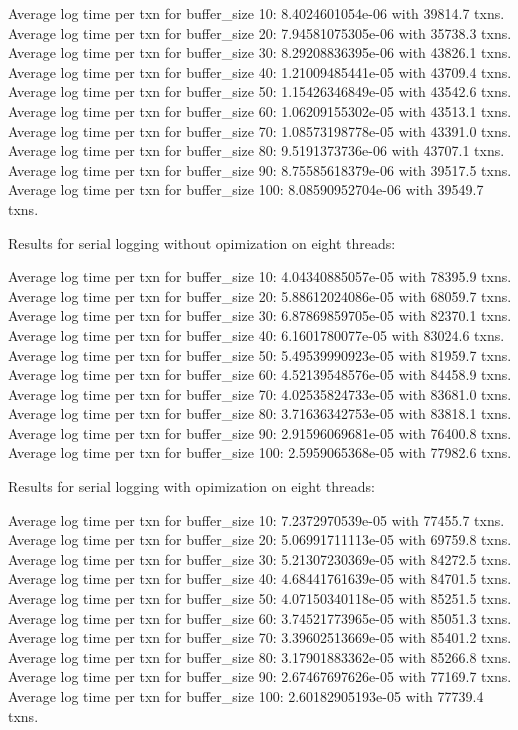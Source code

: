 Average log time per txn for buffer_size 10: 8.4024601054e-06 with 39814.7 txns.
Average log time per txn for buffer_size 20: 7.94581075305e-06 with 35738.3 txns.
Average log time per txn for buffer_size 30: 8.29208836395e-06 with 43826.1 txns.
Average log time per txn for buffer_size 40: 1.21009485441e-05 with 43709.4 txns.
Average log time per txn for buffer_size 50: 1.15426346849e-05 with 43542.6 txns.
Average log time per txn for buffer_size 60: 1.06209155302e-05 with 43513.1 txns.
Average log time per txn for buffer_size 70: 1.08573198778e-05 with 43391.0 txns.
Average log time per txn for buffer_size 80: 9.5191373736e-06 with 43707.1 txns.
Average log time per txn for buffer_size 90: 8.75585618379e-06 with 39517.5 txns.
Average log time per txn for buffer_size 100: 8.08590952704e-06 with 39549.7 txns.

Results for serial logging without opimization on eight threads:


Average log time per txn for buffer_size 10: 4.04340885057e-05 with 78395.9 txns.
Average log time per txn for buffer_size 20: 5.88612024086e-05 with 68059.7 txns.
Average log time per txn for buffer_size 30: 6.87869859705e-05 with 82370.1 txns.
Average log time per txn for buffer_size 40: 6.1601780077e-05 with 83024.6 txns.
Average log time per txn for buffer_size 50: 5.49539990923e-05 with 81959.7 txns.
Average log time per txn for buffer_size 60: 4.52139548576e-05 with 84458.9 txns.
Average log time per txn for buffer_size 70: 4.02535824733e-05 with 83681.0 txns.
Average log time per txn for buffer_size 80: 3.71636342753e-05 with 83818.1 txns.
Average log time per txn for buffer_size 90: 2.91596069681e-05 with 76400.8 txns.
Average log time per txn for buffer_size 100: 2.5959065368e-05 with 77982.6 txns.

Results for serial logging with opimization on eight threads:


Average log time per txn for buffer_size 10: 7.2372970539e-05 with 77455.7 txns.
Average log time per txn for buffer_size 20: 5.06991711113e-05 with 69759.8 txns.
Average log time per txn for buffer_size 30: 5.21307230369e-05 with 84272.5 txns.
Average log time per txn for buffer_size 40: 4.68441761639e-05 with 84701.5 txns.
Average log time per txn for buffer_size 50: 4.07150340118e-05 with 85251.5 txns.
Average log time per txn for buffer_size 60: 3.74521773965e-05 with 85051.3 txns.
Average log time per txn for buffer_size 70: 3.39602513669e-05 with 85401.2 txns.
Average log time per txn for buffer_size 80: 3.17901883362e-05 with 85266.8 txns.
Average log time per txn for buffer_size 90: 2.67467697626e-05 with 77169.7 txns.
Average log time per txn for buffer_size 100: 2.60182905193e-05 with 77739.4 txns.
